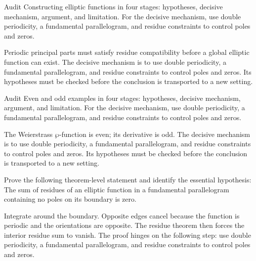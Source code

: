 \begin{problem}\label{prob:iv28-problem-07}
Audit Constructing elliptic functions in four stages: hypotheses, decisive mechanism, argument, and limitation. For the decisive mechanism, use double periodicity, a fundamental parallelogram, and residue constraints to control poles and zeros.
\end{problem}
\begin{solution}
Periodic principal parts must satisfy residue compatibility before a global elliptic function can exist. The decisive mechanism is to use double periodicity, a fundamental parallelogram, and residue constraints to control poles and zeros. Its hypotheses must be checked before the conclusion is transported to a new setting.
\end{solution}

\begin{problem}\label{prob:iv28-problem-08}
Audit Even and odd examples in four stages: hypotheses, decisive mechanism, argument, and limitation. For the decisive mechanism, use double periodicity, a fundamental parallelogram, and residue constraints to control poles and zeros.
\end{problem}
\begin{solution}
The Weierstrass $\wp$-function is even; its derivative is odd. The decisive mechanism is to use double periodicity, a fundamental parallelogram, and residue constraints to control poles and zeros. Its hypotheses must be checked before the conclusion is transported to a new setting.
\end{solution}

\begin{problem}\label{prob:iv28-problem-09}
Prove the following theorem-level statement and identify the essential hypothesis: The sum of residues of an elliptic function in a fundamental parallelogram containing no poles on its boundary is zero.
\end{problem}
\begin{solution}
Integrate around the boundary. Opposite edges cancel because the function is periodic and the orientations are opposite. The residue theorem then forces the interior residue sum to vanish. The proof hinges on the following step: use double periodicity, a fundamental parallelogram, and residue constraints to control poles and zeros.
\end{solution}

